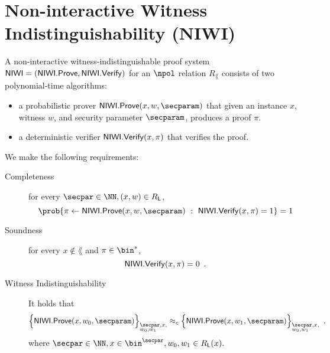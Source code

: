 


\section{Non-interactive Witness Indistinguishability (NIWI)}
	\label{sec:defn:NIWI}
	
	\begin{definition} A non-interactive witness-indistinguishable proof system $\mathsf{NIWI}=(\mathsf{NIWI}.\mathsf{Prove},\mathsf{NIWI}.\mathsf{Verify})$ for an $\npol$ relation $R_\lang$ consists of two polynomial-time algorithms:
		\begin{itemize}
			\item a probabilistic prover $\NIWI.\prove(x,w,\secparam)$ that given an instance $x$, witness $w$, and security parameter $\secparam$, produces a proof $\pi$.
			\item a deterministic verifier $\mathsf{NIWI}.\mathsf{Verify}(x,\pi)$ that verifies the proof.
		\end{itemize}
		We make the following requirements:
		\begin{description}
			\item[Completeness] for every $\secpar \in \NN, (x,w) \in R_\lang$,
			\[
				\prob{\pi \leftarrow \NIWI.\prove(x,w,\secparam)~:~\NIWI.\verify(x,\pi)=1} = 1
			\]
			\item[Soundness] for every $x \notin \lang$ and $\pi \in \bin^*$,
			\[
				\mathsf{NIWI}.\mathsf{Verify}(x,\pi)=0\enspace.
			\]
			\item[Witness Indistinguishability] It holds that
			\[
				\Big\lbrace \NIWI.\prove(x,w_0,\secparam) \Big\rbrace_{\begin{subarray}{l}\secpar,x,\\w_0,w_1 \end{subarray}} \approx_c 				\Big\lbrace \NIWI.\prove(x,w_1,\secparam) \Big\rbrace_{\begin{subarray}{l}\secpar,x,\\w_0,w_1 \end{subarray}}\enspace,
			\]
where $\secpar \in \NN, x \in \bin^\secpar, w_0,w_1 \in R_\lang(x).$
		\end{description}
	\end{definition}